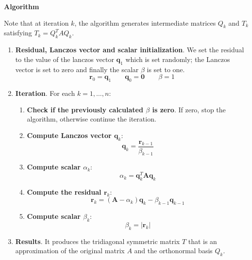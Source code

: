 \begin{flushleft}
    \textcolor{Green3}{ \textbf{Algorithm}}
\end{flushleft}
Note that at iteration $k$, the algorithm generates intermediate matrices $Q_{k}$ and $T_{k}$ satisfying $T_{k} = Q_{k}^{T} A Q_{k}$.
\begin{enumerate}
    \item \textbf{Residual, Lanczos vector and scalar initialization}. We set the residual to the value of the lanczos vector $\mathbf{q}_{1}$ which is set randomly; the Lanczos vector is set to zero and finally the scalar $\beta$ is set to one.
    \begin{equation*}
        \mathbf{r}_{0} = \mathbf{q}_{1}
        \hspace{2em}
        \mathbf{q}_{0} = \mathbf{0}
        \hspace{2em}
        \beta = 1
    \end{equation*}

    \item \textbf{Iteration}. For each $k = 1, \dots, n$:
    \begin{enumerate}
        \item \textbf{Check if the previously calculated $\beta$ is zero}. If zero, stop the algorithm, otherwise continue the iteration.

        \item \textbf{Compute Lanczos vector $\mathbf{q}_{k}$}:
        \begin{equation*}
            \mathbf{q}_{k} = \dfrac{\mathbf{r}_{k-1}}{\beta_{k-1}}
        \end{equation*}

        \item \textbf{Compute scalar $\alpha_{k}$}:
        \begin{equation*}
            \alpha_{k} = \mathbf{q}_{k}^{T} \mathbf{A} \mathbf{q}_{k}
        \end{equation*}

        \item \textbf{Compute the residual $\mathbf{r}_{k}$}:
        \begin{equation*}
            \mathbf{r}_{k} = \left(\mathbf{A} - \alpha_{k}\right)\mathbf{q}_{k} - \beta_{k-1}\mathbf{q}_{k-1}
        \end{equation*}

        \item \textbf{Compute scalar $\beta_{k}$}:
        \begin{equation*}
            \beta_{k} = \left|\mathbf{r}_{k}\right|
        \end{equation*}
    \end{enumerate}

    \item \textbf{Results}. It produces the tridiagonal symmetric matrix $T$ that is an approximation of the original matrix $A$ and the orthonormal basis $Q_{k}$.
\end{enumerate}

